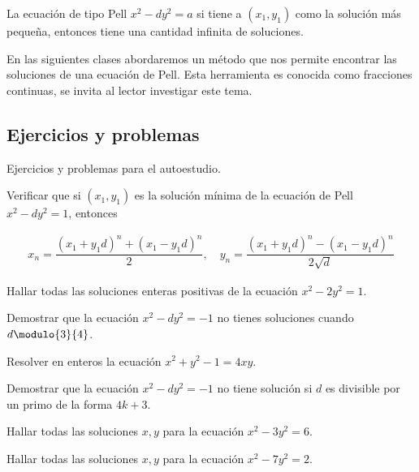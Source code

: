 \begin{theorem.box}{}{}
    La ecuación de tipo Pell $x^2 - dy^2 = a$ si tiene a $(x_1, y_1)$ como la solución más pequeña,
    entonces tiene una cantidad infinita de soluciones.
\end{theorem.box}

En las siguientes clases abordaremos un método que nos permite encontrar las soluciones de una ecuación de Pell.
Esta herramienta es conocida como fracciones continuas, se invita al lector investigar este tema.

\subsection{Ejercicios y problemas}
Ejercicios y problemas para el autoestudio.

\begin{exercise}
    Verificar que si $(x_1, y_1)$ es la solución mínima de la ecuación de Pell $x^2 - dy^2 = 1$, entonces

    \begin{align*}
        x_n = \dfrac{(x_1 + y_1 d)^n + (x_1 - y_1 d)^n}{2}, \quad
        y_n = \dfrac{(x_1 + y_1 d)^n - (x_1 - y_1 d)^n}{2\sqrt{d}}
    \end{align*}
\end{exercise}

\begin{exercise}
    Hallar todas las soluciones enteras positivas de la ecuación $x^2 - 2y^2 = 1$.
\end{exercise}

\begin{exercise}
    Demostrar que la ecuación $x^2 - dy^2 = -1$ no tienes soluciones cuando $d \modulo{3}{4}$.
\end{exercise}

\begin{problem}
    Resolver en enteros la ecuación $x^2 + y^2 - 1 = 4xy$.
\end{problem}

\begin{problem}
    Demostrar que la ecuación $x^2 - dy^2 = -1$ no tiene solución si $d$ es divisible por un primo de la forma $4k + 3$.
\end{problem}

\begin{problem}
    Hallar todas las soluciones $x,y$ para la ecuación $x^2 - 3y^2 = 6$.
\end{problem}

\begin{problem}
    Hallar todas las soluciones $x,y$ para la ecuación $x^2 - 7y^2 = 2$.
\end{problem}